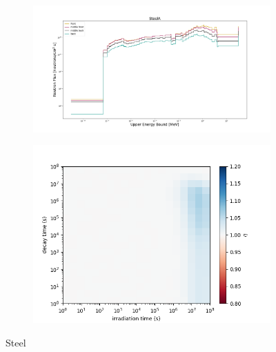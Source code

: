 \begin{figure}[!ht]
    \begin{subfigure}{0.5\textwidth}
        \includegraphics[scale=0.23, trim={4cm 1cm 4cm 2cm},clip]{figs/steelA_flux.png}
    \end{subfigure}
    \begin{subfigure}{0.5\textwidth}
        \centering
        \includegraphics[scale=0.45, trim={0cm 0cm 2cm 0cm},clip]{figs/steelA_front.png}
    \end{subfigure}
    \caption{Steel}
    \label{fig:1spec_8v}
\end{figure}
